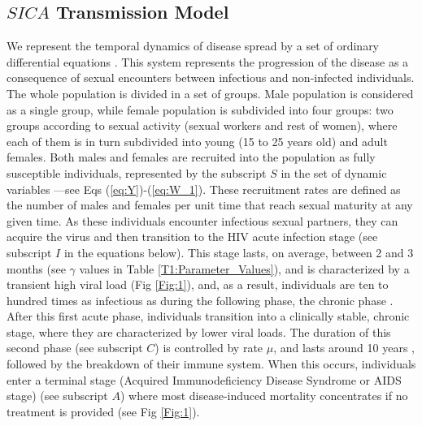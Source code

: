 \documentclass[preprint,12pt]{elsarticle}
\begin{document}
\subsection{$SICA$ Transmission Model}
We represent the temporal dynamics of disease spread by a set of ordinary differential equations \cite{Anderson91}. This system represents the progression of the disease as a consequence of sexual encounters between infectious and non-infected individuals. The whole population is divided in a set of groups. Male population is considered as a single group, while female population is subdivided into four groups: two groups according to sexual activity (sexual workers and rest of women), where each of them is in turn subdivided into young (15 to 25 years old) and adult females. Both males and females are recruited into the population as fully susceptible individuals, represented by the subscript $S$ in the set of dynamic variables ---see Eqs (\ref{eq:Y})-(\ref{eq:W_1}). These recruitment rates are defined as the number of males and females per unit time that reach sexual maturity at any given time. As these individuals encounter infectious sexual partners, they can acquire the virus and then transition to the HIV acute infection stage (see subscript $I$ in the equations below). This stage lasts, on average, between 2 and 3 months \cite{Fiebig2003,Hollingsworth2008} (see $\gamma$ values in Table \ref{T1:Parameter_Values}), and is characterized by a transient high viral load (Fig \ref{Fig:1}), and, as a result, individuals are ten to hundred times as infectious as during the following phase, the chronic phase \cite{Pinkerton2008,Hollingsworth2008}. After this first acute phase, individuals transition into a clinically stable, chronic stage, where they are characterized by lower viral loads. The duration of this second phase (see subscript $C$) is controlled by rate $\mu$, and lasts around 10 years \cite{Bacchetti1989,Hollingsworth2008}, followed by the breakdown of their immune system. When this occurs, individuals enter a terminal stage (Acquired Immunodeficiency Disease Syndrome or AIDS stage) (see subscript $A$) where most disease-induced mortality concentrates if no treatment is provided (see Fig \ref{Fig:1}). 
\smallskip
\end{document}
